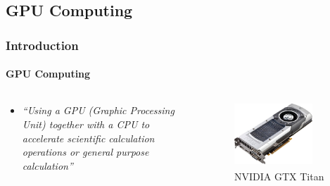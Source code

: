 \subsection{GPU Computing}
\begin{frame}
    \frametitle{Introduction}
    \framesubtitle{GPU Computing}

    \begin{columns}
        \begin{column}{0.6\textwidth}
            \begin{itemize}
                \item \emph{``Using a GPU (Graphic Processing Unit) together with
                      a CPU to accelerate scientific calculation operations
                      or general purpose calculation''}
            \end{itemize}
        \end{column}
        \begin{column}{0.4\textwidth}
             \begin{figure}
                 \centering
                 \includegraphics[width=0.8\textwidth]{img/titan}
                 \caption{NVIDIA\textsuperscript{\textregistered} GTX Titan}
                 \label{fig:titan}
             \end{figure}
        \end{column}
    \end{columns}
\end{frame}

